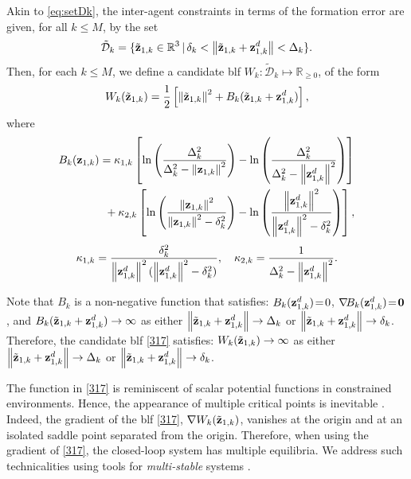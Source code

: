 Akin to \eqref{eq:setDk}, the inter-agent constraints in terms of the formation error are given, for all $k\leq M$, by the set
\begin{equation}\label{n367}
\tilde{\mathcal{D}}_k=\{\tilde{\mathbf{z}}_{1, k}\in\mathbb{R}^{3}\,|\,\delta_k<\left\|\tilde{\mathbf{z}}_{1, k}+\mathbf{z}_{1, k}^d\right\|<\Delta_k\}.
\end{equation}
Then, for each $k\leq M$, we define a candidate \gls{blf} $W_k:\mathcal{\tilde D}_k\mapsto\mathbb{R}_{\geq 0}$, of the form
\begin{equation}\label{317}
W_k(\tilde{\mathbf{z}}_{1, k}) = \frac{1}{2}\left[\left\|\tilde{\mathbf{z}}_{1, k}\right\|^2+B_k(\tilde{\mathbf{z}}_{1, k}+\mathbf{z}_{1, k}^d)\right],
\end{equation}
where 
\begin{equation*}\label{520}\begin{aligned}
B_k(\mat{z}_{1, k}) =&\; 
\kappa_{1, k}\left[\ln\left(\frac{\Delta_k^2}{\Delta_k^2-\norm{\mat{z}_{1, k}}^2}\right)-\ln\left(\frac{\Delta_k^2}{\Delta_k^2-\norm{\mat{z}_{1, k}^d}^2}\right)\right]
\\&\hspace{-2mm}+\kappa_{2, k}\left[\ln\left(\frac{\norm{\mat{z}_{1, k}}^2}{\norm{\mat{z}_{1, k}}^2-\delta_k^2}\right)-\ln\left(\frac{\norm{\mat{z}_{1, k}^d}^2}{\norm{\mat{z}_{1, k}^d}^2-\delta_k^2}\right)\right], 
\end{aligned}\end{equation*}
\begin{equation*}\label{379}
\kappa_{1, k} = \frac{\delta_k^2}{\left\|\mathbf{z}_{1, k}^d\right\|^2(\left\|\mathbf{z}_{1, k}^d\right\|^2-\delta_k^2)},\quad \kappa_{2, k}=\frac{1}{\Delta_k^2-\left\|\mathbf{z}_{1, k}^d\right\|^2}.
\end{equation*}

Note that $B_k$ is a non-negative function that satisfies: ${B}_k(\mathbf{z}_{1, k}^d)\! =\! 0$, $\nabla\!{B}_k(\mathbf{z}_{1, k}^d)\! =\! \mathbf{0}$, and ${B}_k(\tilde{\mathbf{z}}_{1, k}+\mathbf{z}_{1, k}^d)\rightarrow\infty$ as either $\left\|\tilde{\mathbf{z}}_{1, k}+\mathbf{z}_{1, k}^d\right\|\rightarrow\Delta_k$ or $\left\|\tilde{\mathbf{z}}_{1, k}+\mathbf{z}_{1, k}^d\right\|\rightarrow\delta_k$.
Therefore, the candidate \gls{blf} \eqref{317} satisfies: $W_k(\tilde{\mathbf{z}}_{1, k})\rightarrow\infty$ as either $\left\|\tilde{\mathbf{z}}_{1, k}+\mathbf{z}_{1, k}^d\right\|\rightarrow\Delta_k$ or $\left\|\tilde{\mathbf{z}}_{1, k}+\mathbf{z}_{1, k}^d\right\|\rightarrow\delta_k$.

\begin{rmk}\label{rmk:V:equilibria}
	The function in \eqref{317} is reminiscent of scalar potential functions in constrained environments. Hence, the appearance of multiple critical points is inevitable \cite{rimon_exact_1992}.
	Indeed, the gradient of the \gls{blf} \eqref{317}, $\nabla W_k(\tilde{\mathbf{z}}_{1, k})$, vanishes at the origin and at an isolated saddle point separated from the origin. 
	Therefore, when using the gradient of \eqref{317}, the closed-loop system has multiple equilibria.
	We address such technicalities using tools for \textit{multi-stable} systems \cite{forni_cascade_2016,monzon2006local}.
\end{rmk}

